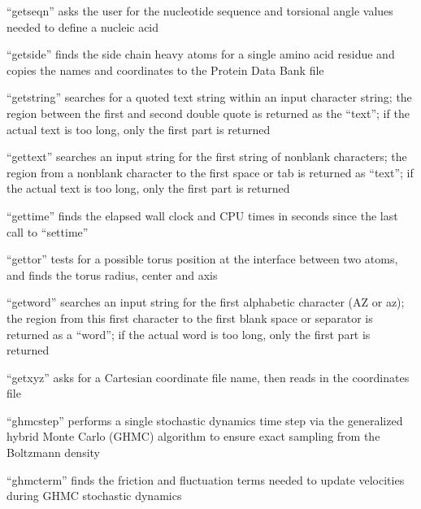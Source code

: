 \documentclass[letterpaper,11pt,english]{sphinxmanual}
\begin{document}
“getseqn” asks the user for the nucleotide sequence and
torsional angle values needed to define a nucleic acid


“getside” finds the side chain heavy atoms for a single amino
acid residue and copies the names and coordinates to the Protein
Data Bank file


“getstring” searches for a quoted text string within an input
character string; the region between the first and second
double quote is returned as the “text”; if the actual text is
too long, only the first part is returned


“gettext” searches an input string for the first string of
non\sphinxhyphen{}blank characters; the region from a non\sphinxhyphen{}blank character
to the first space or tab is returned as “text”; if the
actual text is too long, only the first part is returned


“gettime” finds the elapsed wall clock and CPU times in seconds
since the last call to “settime”


“gettor” tests for a possible torus position at the interface
between two atoms, and finds the torus radius, center and axis


“getword” searches an input string for the first alphabetic
character (A\sphinxhyphen{}Z or a\sphinxhyphen{}z); the region from this first character
to the first blank space or separator is returned as a “word”;
if the actual word is too long, only the first part is returned


“getxyz” asks for a Cartesian coordinate file name,
then reads in the coordinates file


“ghmcstep” performs a single stochastic dynamics time step via
the generalized hybrid Monte Carlo (GHMC) algorithm to ensure
exact sampling from the Boltzmann density


“ghmcterm” finds the friction and fluctuation terms needed
to update velocities during GHMC stochastic dynamics
\end{document}
